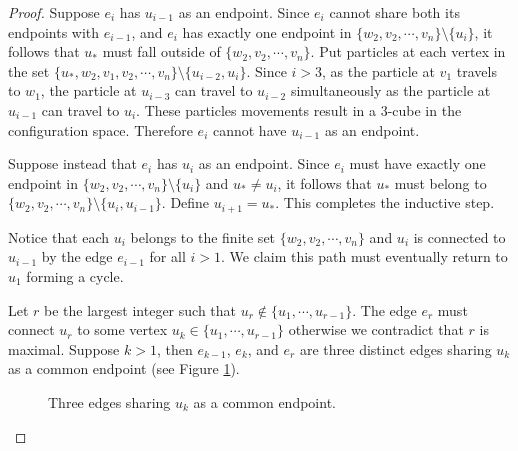 \begin{proof}
    Suppose \(e_i\) has \(u_{i-1}\) as an endpoint.
    Since \(e_i\) cannot share both its endpoints with \(e_{i-1}\), and
    \(e_i\) has exactly one endpoint in \(\{w_2, v_2, \cdots, v_n\}\setminus\{u_i\}\),
    it follows that \(u_*\) must fall outside of \(\{w_2, v_2, \cdots, v_n\}\).
    Put particles at each vertex in the set \(\{u_*, w_2, v_1, v_2, \cdots, v_n\}\setminus\{u_{i-2}, u_i\}\).
    Since \(i > 3\), as the particle at \(v_1\) travels to \(w_1\),
    the particle at \(u_{i-3}\) can travel to \(u_{i-2}\) simultaneously as the particle
    at \(u_{i-1}\) can travel to \(u_i\).
    These particles movements result in a \(3\)-cube in the configuration space.
    Therefore \(e_i\) cannot have \(u_{i-1}\) as an endpoint.
    
    Suppose instead that \(e_i\) has \(u_i\) as an endpoint.
    Since \(e_i\) must have exactly one endpoint in \(\{w_2, v_2, \cdots, v_n\}\setminus\{u_i\}\) and \(u_* \neq u_i\),
    it follows that \(u_*\) must belong to \(\{w_2, v_2, \cdots, v_n\}\setminus\{u_i, u_{i-1}\}\).
    Define \(u_{i+1} = u_*\).
    This completes the inductive step.
    
    Notice that each \(u_i\) belongs to the finite set \(\{w_2, v_2, \cdots, v_n\}\)
    and \(u_i\) is connected to \(u_{i-1}\) by the edge \(e_{i-1}\) for all \(i > 1\).
    We claim this path must eventually return to \(u_1\) forming a cycle.

    Let \(r\) be the largest integer such that \(u_r \not \in \{u_1, \cdots, u_{r-1}\}\).
    The edge \(e_r\) must connect \(u_r\) to some vertex \(u_k \in \{u_1, \cdots, u_{r-1}\}\)
    otherwise we contradict that \(r\) is maximal.
    Suppose \(k > 1\), then \(e_{k-1}\), \(e_k\), and \(e_r\) are three distinct
    edges sharing \(u_k\) as a common endpoint (see Figure \ref{fig:lem:is_surface_2_6}).

    \begin{figure}[h!]
        \centering
        \caption{Three edges sharing \(u_k\) as a common endpoint.}
        \label{fig:lem:is_surface_2_6}
    \end{figure}


\end{proof}
